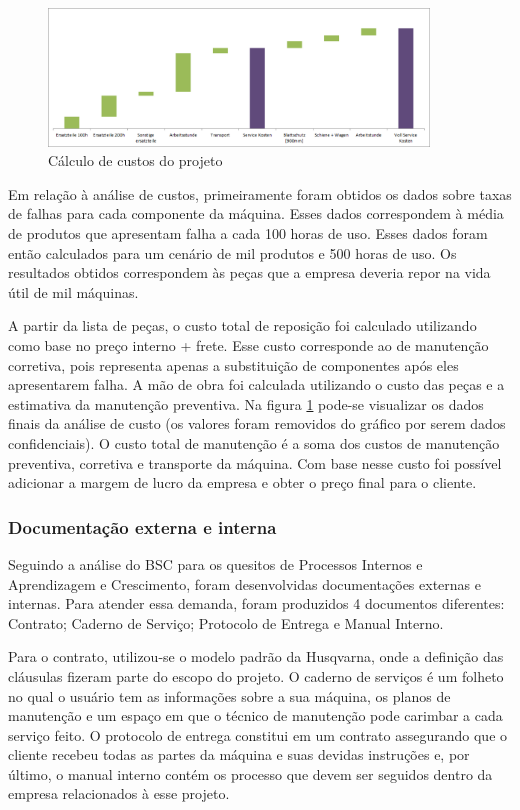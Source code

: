 \documentclass[12pt]{article}
\begin{document}
\begin{figure}[h!]
	\centering
	\includegraphics[width=0.9\textwidth]{img/ws220-waterfall.png}
	\caption{Cálculo de custos do projeto}
	\label{fig:ws-waterfall}
\end{figure}

	Em relação à análise de custos, primeiramente foram obtidos os dados sobre taxas de falhas para cada componente da máquina. Esses dados correspondem à média de produtos que apresentam falha a cada 100 horas de uso. Esses dados foram então calculados para um cenário de mil produtos e 500 horas de uso. Os resultados obtidos correspondem às peças que a empresa deveria repor na vida útil de mil máquinas. 
	
	A partir da lista de peças, o custo total de reposição foi calculado utilizando como base no preço interno + frete. Esse custo corresponde ao de manutenção corretiva, pois representa apenas a substituição de componentes após eles apresentarem falha. A mão de obra foi calculada utilizando o custo das peças e a estimativa da manutenção preventiva. Na figura \ref{fig:ws-waterfall} pode-se visualizar os dados finais da análise de custo (os valores foram removidos do gráfico por serem dados confidenciais). O custo total de manutenção é a soma dos custos de manutenção preventiva, corretiva e transporte da máquina. Com base nesse custo foi possível adicionar a margem de lucro da empresa e obter o preço final para o cliente.
	
\subsubsection{Documentação externa e interna}

	Seguindo a análise do BSC para os quesitos de Processos Internos e Aprendizagem e Crescimento, foram desenvolvidas documentações externas e internas. Para atender essa demanda, foram produzidos 4 documentos diferentes: Contrato; Caderno de Serviço; Protocolo de Entrega e Manual Interno.

	Para o contrato, utilizou-se o modelo padrão da Husqvarna, onde a definição das cláusulas fizeram parte do escopo do projeto. O caderno de serviços é um folheto no qual o usuário tem as informações sobre a sua máquina, os planos de manutenção e um espaço em que o técnico de manutenção pode carimbar a cada serviço feito. O protocolo de entrega constitui em um contrato assegurando que o cliente recebeu todas as partes da máquina e suas devidas instruções e, por último, o manual interno contém os processo que devem ser seguidos dentro da empresa relacionados à esse projeto.
\end{document}
